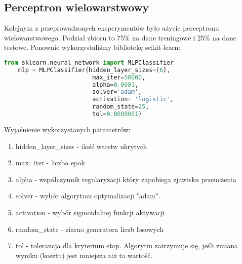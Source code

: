 \subsection{Perceptron wielowarstwowy}
Kolejnym z przeprowadzonych eksperymentów było użycie perceptronu wielowarstwowego. Podział zbioru to 75\% na dane treningowe i 25\% na dane testowe. Ponownie wykorzystaliśmy bibliotekę scikit-learn:

\begin{lstlisting}[language=Python, caption=Definicja perceptronu wielowarstwowego]
    from sklearn.neural_network import MLPClassifier
    mlp = MLPClassifier(hidden_layer_sizes=(6),
                         max_iter=50000, 
                         alpha=0.0001,
                         solver='adam',
                         activation= 'logistic', 
                         random_state=25,
                         tol=0.0000001)
\end{lstlisting}

Wyjaśnienie wykorzystanych parametrów:
\begin{enumerate}
    \item hidden\_layer\_sizes - ilość warstw ukrytych
    \item max\_iter - liczba epok
    \item alpha - współczynnik regularyzacji który zapobiega zjawisku przeuczenia
    \item solver - wybór algorytmu optymalizacji "adam".
    \item activation - wybór sigmoidalnej funkcji aktywacji
    \item random\_state - ziarno generatora liczb losowych
    \item tol - tolerancja dla kryterium stop. Algorytm zatrzymuje się, jeśli zmiana wyniku (kosztu) jest mniejsza niż ta wartość.
\end{enumerate}

